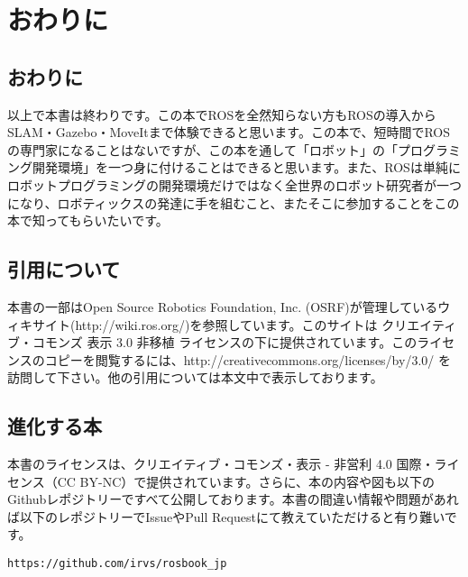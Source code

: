 \chapter*{おわりに}

\section*{おわりに}

以上で本書は終わりです。この本でROSを全然知らない方もROSの導入からSLAM・Gazebo・MoveItまで体験できると思います。この本で、短時間でROSの専門家になることはないですが、この本を通して「ロボット」の「プログラミング開発環境」を一つ身に付けることはできると思います。また、ROSは単純にロボットプログラミングの開発環境だけではなく全世界のロボット研究者が一つになり、ロボティックスの発達に手を組むこと、またそこに参加することをこの本で知ってもらいたいです。

\section*{引用について}

本書の一部はOpen Source Robotics Foundation, Inc. (OSRF)が管理しているウィキサイト(http://wiki.ros.org/)を参照しています。このサイトは クリエイティブ・コモンズ 表示 3.0 非移植 ライセンスの下に提供されています。このライセンスのコピーを閲覧するには、http://creativecommons.org/licenses/by/3.0/ を訪問して下さい。他の引用については本文中で表示しております。

\section*{進化する本}

本書のライセンスは、クリエイティブ・コモンズ・表示 - 非営利 4.0 国際・ライセンス（CC BY-NC）で提供されています。さらに、本の内容や図も以下のGithubレポジトリーですべて公開しております。本書の間違い情報や問題があれば以下のレポジトリーでIssueやPull Requestにて教えていただけると有り難いです。

\begin{lstlisting}
https://github.com/irvs/rosbook_jp
\end{lstlisting}

